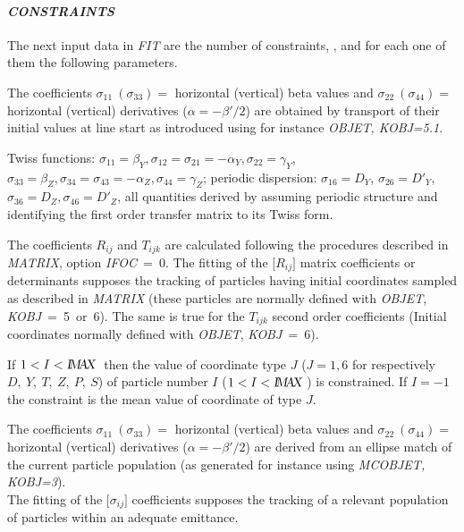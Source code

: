 \smallskip

\paragraph{\textit{CONSTRAINTS}} 

\noindent The next input data in \textsl{FIT} are the number of constraints,
\textsl{\NC}, and for each one of them the following parameters.
\bigskip


 The coefficients 
$ \sigma_{11}~(\sigma_{ 33}) = $ horizontal (vertical) beta values and 
$ \sigma_{ 22}~(\sigma_{ 44}) = $ horizontal (vertical) derivatives ($\alpha = -\beta'/2$) 
are obtained by transport of their initial values at line start as introduced using for instance  
\textsl{OBJET, KOBJ=5.1}.\\

\bigskip

 Twiss functions: $\sigma_{11}=\beta_Y, \sigma_{12}=\sigma_{21}=-\alpha_Y, 
\sigma_{22}=\gamma_Y$, $\sigma_{33}=\beta_Z, \sigma_{34}=\sigma_{43}=-\alpha_Z, \sigma_{44}=\gamma_Z$; periodic dispersion: 
$\sigma_{16}=D_Y$, $\sigma_{26}=D'_Y$,  $\sigma_{36}=D_Z, \sigma_{46}=D'_Z$, all quantities derived by assuming 
 periodic structure and identifying the first order transfer matrix to its Twiss form. 
\bigskip


  The coefficients $ R_{ij} $ and $ T_{ijk} $ are calculated following
the procedures described in \textsl{MATRIX}, option \mbox{\textsl{IFOC} = 0}. 
The fitting of the $ \lbrack R_{ij}\rbrack $ matrix coefficients or
determinants supposes the tracking of particles having initial coordinates 
sampled as described in \textsl{MATRIX} (these particles are normally defined with 
\textsl{OBJET}, \mbox{\textsl{KOBJ} = 5 or 6}). The same is true for the $ T_{ijk} $
second order coefficients (Initial coordinates normally defined with \textsl{OBJET}, 
\mbox{\textsl{KOBJ} = 6}).  
\bigskip


 If $1<I<\textsl{I\!M\!A\!X }$ then the value of coordinate type $J$ ($J=1,6$ for respectively 
 $D,~Y,~T,~Z,~P,~S$) of particle number $I$ ($1<I<\textsl{I\!M\!A\!X }$) 
is constrained.  If $I=-1$ the constraint is the mean value of coordinate of type $J$. 
\bigskip


 The coefficients 
$ \sigma_{11}~(\sigma_{ 33}) = $ horizontal (vertical) beta values and 
$ \sigma_{ 22}~(\sigma_{ 44}) = $ horizontal (vertical) derivatives ($\alpha = -\beta'/2$) 
are derived from an ellipse match of the current particle population (as generated for instance using 
\textsl{MCOBJET, KOBJ=3}).\\
%
The fitting of the $ \lbrack \sigma_{ij}\rbrack $ 
coefficients supposes the tracking of a relevant population of particles within an 
adequate emittance.  
\bigskip

